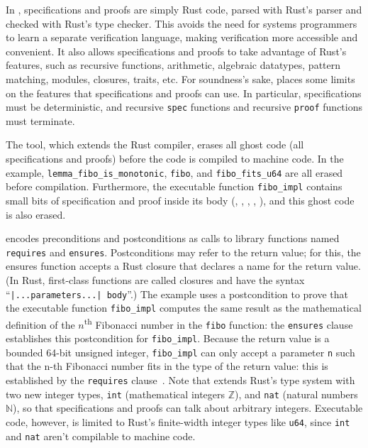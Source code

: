 In \verus, specifications and proofs are simply Rust code,
parsed with Rust's parser and checked with Rust's type checker.
This avoids the need for systems programmers to learn a separate verification language,
making verification more accessible and convenient.
It also allows specifications and proofs to take advantage of Rust's features,
such as recursive functions, arithmetic, algebraic datatypes,
pattern matching, modules, closures, traits, etc.
For soundness's sake, \verus places some limits
on the features that specifications and proofs can use.
In particular, specifications must be deterministic,
and recursive \verb`spec` functions and recursive \verb`proof` functions must terminate.

The \verus tool, which extends the Rust compiler,
erases all ghost code (all specifications and proofs) before the code is compiled to machine code.
In the example, \verb`lemma_fibo_is_monotonic`, \verb`fibo`, and \verb`fibo_fits_u64`
are all erased before compilation.
Furthermore, the executable function \verb`fibo_impl` contains small bits of specification and proof
inside its body
(,
,
,
,
),
and this ghost code is also erased.

\verus encodes preconditions and postconditions as calls to \verus library functions
named \verb`requires` and \verb`ensures`.
Postconditions may refer to the return value;
for this, the ensures function accepts a Rust closure that declares a name for the return value.
(In Rust, first-class functions are called closures and have the syntax ``\verb`|...parameters...| body`''.)
The example uses a postcondition to prove that the executable function \verb`fibo_impl`
computes the same result as the mathematical definition of the $n$\textsuperscript{th} Fibonacci number in the
\verb`fibo` function: the \verb`ensures` clause~
establishes this postcondition for \verb`fibo_impl`. Because the return value is a bounded 64-bit unsigned
integer, \verb`fibo_impl` can only accept a parameter \verb`n` such that the n-th Fibonacci number fits
in the type of the return value: this is established by the \verb`requires` clause~.
Note that \verus extends Rust's type system with two new integer types,
\verb`int` (mathematical integers $\mathbb{Z}$), and \verb`nat` (natural numbers $\mathbb{N}$),
so that specifications and proofs can talk about arbitrary integers.
Executable code, however, is limited to Rust's finite-width integer types like \verb`u64`,
since \verb`int` and \verb`nat` aren't compilable to machine code.

